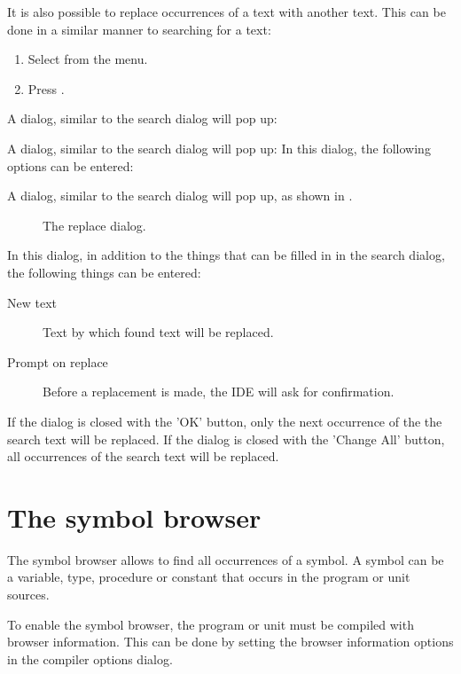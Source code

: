 It is also possible to replace occurrences of a text with another text. 
This can be done in a similar manner to searching for a text:
\begin{enumerate}
\item Select  from the menu.
\item Press .
\end{enumerate}
A dialog, similar to the search dialog will pop up:
\begin{htmlonly}
A dialog, similar to the search dialog will pop up:
In this dialog, the following options can be entered:
\end{htmlonly}
\begin{latexonly}
A dialog, similar to the search dialog will pop up, as shown in .
\begin{figure}[ht]
\caption{The replace dialog.}\label{fig:replace}
\ifpdf
{}
\else
{}
\fi
\end{figure}
\end{latexonly}

In this dialog, in addition to the things that can be filled in in the
search dialog, the following things can be entered:
\begin{description}
\item [New text] Text by which found text will be replaced.
\item [Prompt on replace] Before a replacement is made, the IDE will ask for
confirmation.
\end{description}
If the dialog is closed with the 'OK' button, only the next occurrence of
the the search text will be replaced. 
If the dialog is closed with the 'Change All' button, all occurrences of 
the search text will be replaced.

\section{The symbol browser}
\label{se:browser}
The symbol browser allows to find all occurrences of a symbol. A symbol 
can be a variable, type, procedure or constant that occurs in the
program or unit sources.

To enable the symbol browser, the program or unit must be compiled with
browser information. This can be done by setting the browser information
options in the compiler options dialog.

